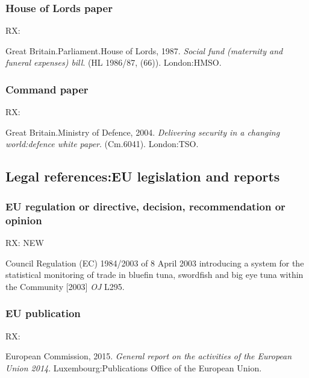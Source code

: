 \subsubsection*{House of Lords paper}

RX: \cite{gb.hl1986/87-66}

Great Britain.\@ Parliament.\@ House of Lords, 1987. \emph{Social fund (maternity and funeral expenses) bill}. (HL 1986/87, (66)). London:\@ HMSO.



\subsubsection*{Command paper}

RX: \cite{gb.cm6041}

Great Britain.\@ Ministry of Defence, 2004. \emph{Delivering security in a changing world:\@ defence white paper}. (Cm.\@ 6041). London:\@ TSO.



\subsection{Legal references:\@ EU legislation and reports}


\subsubsection*{EU regulation or directive, decision, recommendation or opinion}

RX: \cite{eu.dir1984/2003} NEW

Council Regulation (EC) 1984/2003 of 8 April 2003 introducing a system for the statistical monitoring of trade in bluefin tuna, swordfish and big eye tuna within the Community [2003] \emph{OJ} L295.




\subsubsection*{EU publication}

RX: \cite{ec2015gra}

European Commission, 2015. \emph{General report on the activities of the European Union 2014}. Luxembourg:\@ Publications Office of the European Union.



